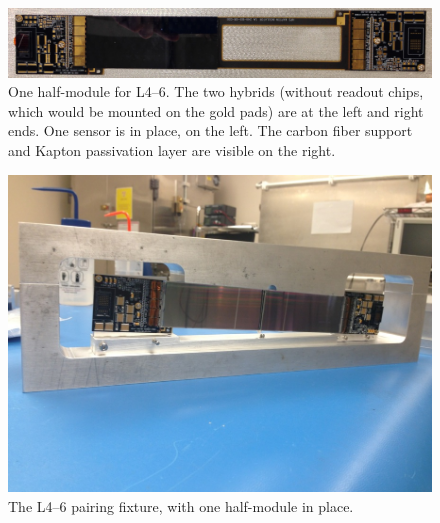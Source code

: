 \begin{figure}[ht]
    \includegraphics[width=\textwidth]{detector/figs/l456_hm}
    \caption{One half-module for L4--6. The two hybrids (without readout chips, which would be mounted on the gold pads) are at the left and right ends. One sensor is in place, on the left. The carbon fiber support and Kapton passivation layer are visible on the right.}
    \label{fig:l456_hm}
\end{figure}

\begin{figure}[ht]
    \includegraphics[width=\textwidth]{detector/figs/pairing_l456}
    \caption{The L4--6 pairing fixture, with one half-module in place.}
    \label{fig:l456_pairing}
\end{figure}

